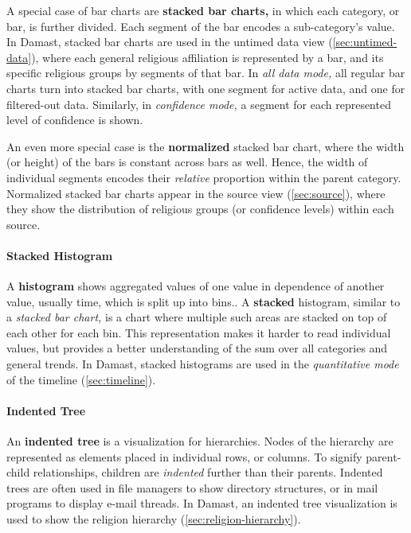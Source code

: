 A special case of bar charts are \textbf{stacked bar charts,} in which each category, or bar, is further divided.
Each segment of the bar encodes a sub-category's value.
In Damast, stacked bar charts are used in the untimed data view (\cref{sec:untimed-data}), where each general religious affiliation is represented by a bar, and its specific religious groups by segments of that bar.
In \emph{all data mode,} all regular bar charts turn into stacked bar charts, with one segment for active data, and one for filtered-out data.
Similarly, in \emph{confidence mode,} a segment for each represented level of confidence is shown.

An even more special case is the \textbf{normalized} stacked bar chart, where the width (or height) of the bars is constant across bars as well.
Hence, the width of individual segments encodes their \emph{relative} proportion within the parent category.
Normalized stacked bar charts appear in the source view (\cref{sec:source}), where they show the distribution of religious groups (or confidence levels) within each source.

\paragraph{Stacked Histogram}
A \textbf{histogram} shows aggregated values of one value in dependence of another value, usually time, which is split up into bins..
A \textbf{stacked} histogram, similar to a \emph{stacked bar chart,} is a chart where multiple such areas are stacked on top of each other for each bin.
This representation makes it harder to read individual values, but provides a better understanding of the sum over all categories and general trends.
In Damast, stacked histograms are used in the \emph{quantitative mode} of the timeline (\cref{sec:timeline}).

\paragraph{Indented Tree}
An \textbf{indented tree} is a visualization for hierarchies.
Nodes of the hierarchy are represented as elements placed in individual rows, or columns.
To signify parent-child relationships, children are \emph{indented} further than their parents.
Indented trees are often used in file managers to show directory structures, or in mail programs to display e-mail threads.
In Damast, an indented tree visualization is used to show the religion hierarchy (\cref{sec:religion-hierarchy}).


